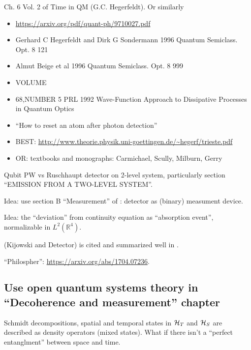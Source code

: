 Ch. 6 Vol. 2 of Time in QM (G.C. Hegerfeldt). Or similarly
\begin{itemize}
  \item \url{https://arxiv.org/pdf/quant-ph/9710027.pdf}
  \item Gerhard C Hegerfeldt and Dirk G Sondermann 1996 Quantum Semiclass. Opt. 8 121
  \item  Almut Beige et al 1996 Quantum Semiclass. Opt. 8 999
  \item VOLUME
  \item 68,NUMBER 5 PRL 1992 Wave-Function Approach to Dissipative Processes in Quantum Optics
  \item ``How to reset an atom after photon detection'' 
  \item BEST: \url{http://www.theorie.physik.uni-goettingen.de/~hegerf/trieste.pdf}
  \item OR: textbooks and monographs: Carmichael, Scully, Milburn, Gerry
\end{itemize}

Qubit PW vs Ruschhaupt detector on 2-level system,
particularly section “EMISSION FROM A TWO-LEVEL SYSTEM”.

Idea: use section B ``Measurement'' of \cite{Lloyd:Time}: detector as (binary) measument device.

Idea: the ``deviation'' from continuity equation as ``absorption event'',
normalizable in $L^2(\mathbb{R}^4)$.

\cite{TQM2} (Kijowski and Detector) is cited and summarized well in
\cite{Halliwell_Detector}.

``Philospher'': \url{https://arxiv.org/abs/1704.07236}.

\subsection{Use open quantum systems theory in ``Decoherence and measurement'' chapter}
Schmidt decompositions, spatial and temporal states in
$\mathcal{H}_T$ and $\mathcal{H}_S$
are described as density operators
(mixed states). What if there isn't a ``perfect entanglment'' between space and time.
